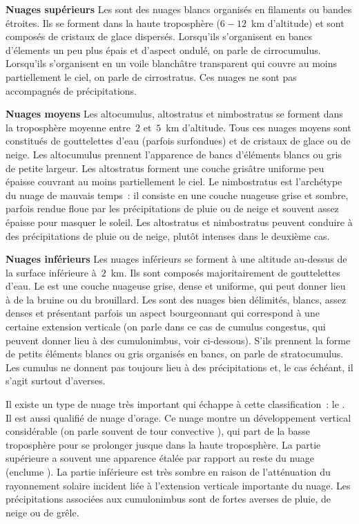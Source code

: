 \begin{description}

\item{\textbf{Nuages supérieurs}} Les  sont des nuages blancs organisés en filaments ou bandes étroites. Ils se forment dans la haute troposphère ($6-12$~km d'altitude) et sont composés de cristaux de glace dispersés. Lorsqu'ils s'organisent en bancs d'élements un peu plus épais et d'aspect ondulé, on parle de cirrocumulus. Lorsqu'ils s'organisent en un voile blanchâtre transparent qui couvre au moins partiellement le ciel, on parle de cirrostratus. Ces nuages ne sont pas accompagnés de précipitations.

\item{\textbf{Nuages moyens}} Les altocumulus, altostratus et nimbostratus se forment dans la troposphère moyenne entre~$2$ et~$5$~km d'altitude. Tous ces nuages moyens sont constitués de gouttelettes d'eau (parfois surfondues) et de cristaux de glace ou de neige. Les altocumulus prennent l'apparence de bancs d'éléments blancs ou gris de petite largeur. Les altostratus forment une couche grisâtre uniforme peu épaisse couvrant au moins partiellement le ciel. Le nimbostratus est l'archétype du nuage de mauvais temps~: il consiste en une couche nuageuse grise et sombre, parfois rendue floue par les précipitations de pluie ou de neige et souvent assez épaisse pour masquer le soleil. Les altostratus et nimbostratus peuvent conduire à des précipitations de pluie ou de neige, plutôt intenses dans le deuxième cas.

\item{\textbf{Nuages inférieurs}} Les nuages inférieurs se forment à une altitude au-dessus de la surface inférieure à~$2$~km. Ils sont composés majoritairement de gouttelettes d'eau. Le  est une couche nuageuse grise, dense et uniforme, qui peut donner lieu à de la bruine ou du brouillard. Les  sont des nuages bien délimités, blancs, assez denses et présentant parfois un aspect bourgeonnant qui correspond à une certaine extension verticale (on parle dans ce cas de cumulus congestus, qui peuvent donner lieu à des cumulonimbus, voir ci-dessous). S'ils prennent la forme de petits éléments blancs ou gris organisés en bancs, on parle de stratocumulus. Les cumulus ne donnent pas toujours lieu à des précipitations et, le cas échéant, il s'agit surtout d'averses.

\end{description}

Il existe un type de nuage très important qui échappe à cette classification~: le . Il est aussi qualifié de nuage d'orage. Ce nuage montre un développement vertical considérable (on parle souvent de \og tour convective \fg), qui part de la basse troposphère pour se prolonger jusque dans la haute troposphère. La partie supérieure a souvent une apparence étalée par rapport au reste du nuage (\og enclume \fg). La partie inférieure est très sombre en raison de l'atténuation du rayonnement solaire incident liée à l'extension verticale importante du nuage. Les précipitations associées aux cumulonimbus sont de fortes averses de pluie, de neige ou de grêle.

